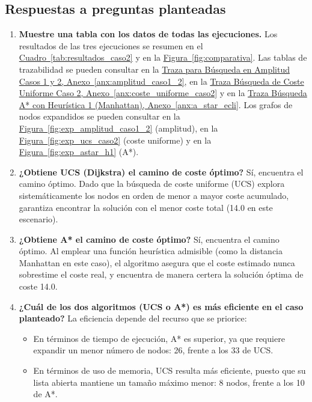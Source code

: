 \documentclass[12pt,a4paper]{article}
\begin{document}
\subsection{Respuestas a preguntas planteadas}
\begin{enumerate}
  \item
  \textbf{Muestre una tabla con los datos de todas las ejecuciones.}
  Los resultados de las tres ejecuciones se resumen en el \hyperref[tab:resultados_caso2]{Cuadro~\ref*{tab:resultados_caso2}} y en la \hyperref[fig:comparativa]{Figura~\ref*{fig:comparativa}}. Las tablas de trazabilidad se pueden consultar en la \hyperref[anx:amplitud_caso1_2]{Traza para Búsqueda en Amplitud Casos 1 y 2, Anexo~\ref*{anx:amplitud_caso1_2}}, en la \hyperref[anx:coste_uniforme_caso2]{Traza Búsqueda de Coste Uniforme Caso 2, Anexo~\ref*{anx:coste_uniforme_caso2}} y en la \hyperref[anx:a_star_ecli]{Traza Búsqueda A* con Heurística 1 (Manhattan), Anexo~\ref*{anx:a_star_ecli}}. Los grafos de nodos expandidos se pueden consultar en la \hyperref[fig:exp_amplitud_caso1_2]{Figura~\ref*{fig:exp_amplitud_caso1_2}} (amplitud), en la \hyperref[fig:exp_ucs_caso2]{Figura~\ref*{fig:exp_ucs_caso2}} (coste uniforme) y en la \hyperref[fig:exp_astar_h1]{Figura~\ref*{fig:exp_astar_h1}} (A*).
  \item \textbf{¿Obtiene UCS (Dijkstra) el camino de coste óptimo?} Sí, encuentra el camino óptimo. Dado que la búsqueda de coste uniforme (UCS) explora sistemáticamente los nodos en orden de menor a mayor coste acumulado, garantiza encontrar la solución con el menor coste total (14.0 en este escenario).
  \item \textbf{¿Obtiene A* el camino de coste óptimo?} Sí, encuentra el camino óptimo. Al emplear una función heurística admisible (como la distancia Manhattan en este caso), el algoritmo asegura que el coste estimado nunca sobrestime el coste real, y encuentra de manera certera la solución óptima de coste 14.0.
  \item \textbf{¿Cuál de los dos algoritmos (UCS o A*) es más eficiente en el caso planteado?} La eficiencia depende del recurso que se priorice:
	\begin{itemize}
		\item En términos de tiempo de ejecución, A* es superior, ya que requiere expandir un menor número de nodos: 26, frente a los 33 de UCS.
		\item En términos de uso de memoria, UCS resulta más eficiente, puesto que su lista abierta mantiene un tamaño máximo menor: 8 nodos, frente a los 10 de A*.

\end{itemize}
\end{enumerate}
\end{document}
